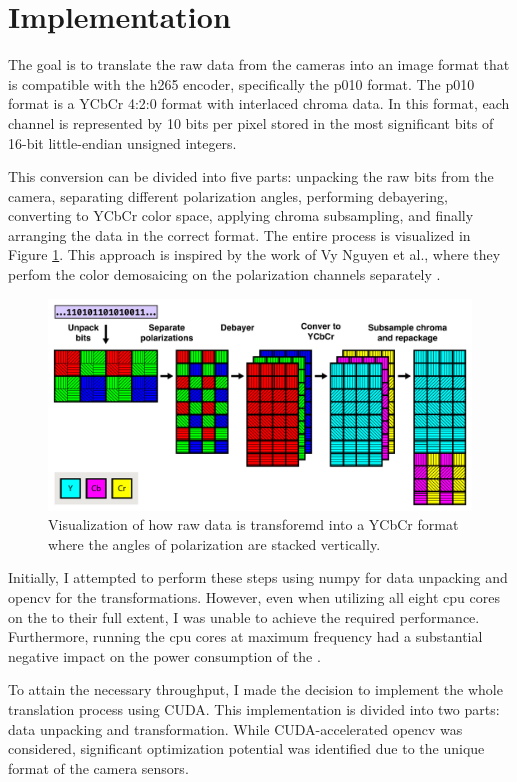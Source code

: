 \section{Implementation}
The goal is to translate the raw data from the cameras into an image format that is compatible with the \gls{h265} encoder, specifically the \gls{p010} format.
The \gls{p010} format is a YCbCr 4:2:0 format with interlaced chroma data.
In this format, each channel is represented by 10 bits per pixel stored in the most significant bits of 16-bit little-endian unsigned integers.

This conversion can be divided into five parts: unpacking the raw bits from the camera, separating different polarization angles, performing debayering, converting to YCbCr color space, applying chroma subsampling, and finally arranging the data in the correct format.
The entire process is visualized in Figure \ref{fig:transform}.
This approach is inspired by the work of Vy Nguyen et al., where they perfom the color demosaicing on the polarization channels separately \cite{nguyenTwoStepColorPolarizationDemosaicking2022}.


\begin{figure}[H]
    \centering
    \includegraphics[width=\textwidth]{figures/polarized_image/transform.pdf}
    \caption{Visualization of how raw data is transforemd into a YCbCr format where the angles of polarization are stacked vertically.}
    \label{fig:transform}
\end{figure}


Initially, I attempted to perform these steps using \gls{numpy} for data unpacking and \gls{opencv} for the transformations.
However, even when utilizing all eight \gls{cpu} cores on the \jx to their full extent, I was unable to achieve the required performance.
Furthermore, running the \gls{cpu} cores at maximum frequency had a substantial negative impact on the power consumption of the \jx.

To attain the necessary throughput, I made the decision to implement the whole translation process using CUDA.
This implementation is divided into two parts: data unpacking and transformation.
While CUDA-accelerated \gls{opencv} was considered, significant optimization potential was identified due to the unique format of the camera sensors.
